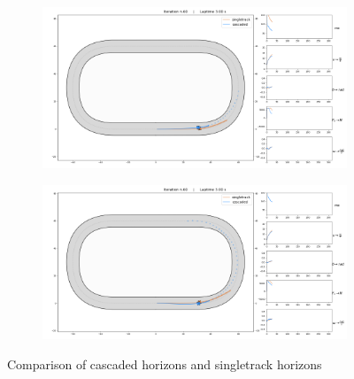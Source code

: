 \documentclass[a4paper, onecolumn, 12pt]{article}
\begin{document}
\begin{figure}[H] 
    \centering
        \begin{subfigure}{0.9\textwidth} 
        \centering
        \includegraphics[width=\textwidth]{assets/im/fig2_50.png}
    \end{subfigure}
    \begin{subfigure}{0.9\textwidth}
        \centering
        \includegraphics[width=\textwidth]{assets/im/fig2_60.png}
    \end{subfigure}
    \caption[short]{Comparison of cascaded horizons and singletrack horizons}
    \label{horizons}
\end{figure}
\end{document}
